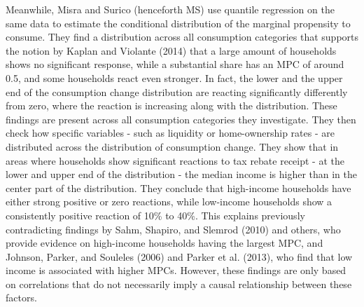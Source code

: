 Meanwhile, Misra and Surico (henceforth MS) use quantile regression on the same data to estimate the conditional distribution of the marginal propensity to consume. They find a distribution across all consumption categories that supports the notion by Kaplan and Violante (2014) that a large amount of households shows no significant response, while a substantial share has an MPC of around 0.5, and some households react even stronger. In fact, the lower and the upper end of the consumption change distribution are reacting significantly differently from zero, where the reaction is increasing along with the distribution. These findings are present across all consumption categories they investigate. They then check how specific variables - such as liquidity or home-ownership rates - are distributed across the distribution of consumption change. They show that in areas where households show significant reactions to tax rebate receipt - at the lower and upper end of the distribution - the median income is higher than in the center part of the distribution. They conclude that high-income households have either strong positive or zero reactions, while low-income households show a consistently positive reaction of 10\% to 40\%. This explains previously contradicting findings by Sahm, Shapiro, and Slemrod (2010) and others, who provide evidence on high-income households having the largest MPC, and Johnson, Parker, and Souleles (2006) and Parker et al. (2013), who find that low income is associated with higher MPCs. However, these findings are only based on correlations that do not necessarily imply a causal relationship between these factors. \\ 
